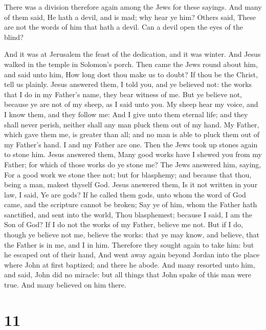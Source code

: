  There was a division therefore again among the Jews for
these sayings.  And many of them said, He hath a devil,
and is mad; why hear ye him?  Others said, These are not
the words of him that hath a devil. Can a devil open the eyes of the
blind?

 And it was at Jerusalem the feast of the dedication, and
it was winter.  And Jesus walked in the temple in
Solomon's porch.  Then came the Jews round about him, and
said unto him, How long dost thou make us to doubt? If thou be the
Christ, tell us plainly.  Jesus answered them, I told
you, and ye believed not: the works that I do in my Father's name, they
bear witness of me.  But ye believe not, because ye are
not of my sheep, as I said unto you.  My sheep hear my
voice, and I know them, and they follow me:  And I give
unto them eternal life; and they shall never perish, neither shall any
man pluck them out of my hand.  My Father, which gave
them me, is greater than all; and no man is able to pluck them out of my
Father's hand.  I and my Father are one. 
Then the Jews took up stones again to stone him.  Jesus
answered them, Many good works have I shewed you from my Father; for
which of those works do ye stone me?  The Jews answered
him, saying, For a good work we stone thee not; but for blasphemy; and
because that thou, being a man, makest thyself God. 
Jesus answered them, Is it not written in your law, I said, Ye are gods?
 If he called them gods, unto whom the word of God came,
and the scripture cannot be broken;  Say ye of him, whom
the Father hath sanctified, and sent into the world, Thou blasphemest;
because I said, I am the Son of God?  If I do not the
works of my Father, believe me not.  But if I do, though
ye believe not me, believe the works: that ye may know, and believe,
that the Father is in me, and I in him.  Therefore they
sought again to take him: but he escaped out of their hand,
 And went away again beyond Jordan into the place where
John at first baptized; and there he abode.  And many
resorted unto him, and said, John did no miracle: but all things that
John spake of this man were true.  And many believed on
him there.

\hypertarget{section-10}{%
\section{11}\label{section-10}}

